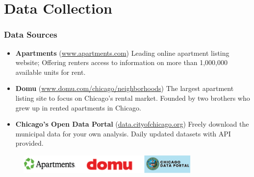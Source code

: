 \documentclass{beamer}
\begin{document}
\section{Data Collection}

\begin{frame}
	\frametitle{Data Sources}
	\begin{itemize}
		\item \textbf{Apartments} (\url{www.apartments.com}) \newline Leading online apartment listing website; Offering renters access to information on more than 1,000,000 available units for rent.
		\item \textbf{Domu} (\url{www.domu.com/chicago/neighborhoods}) \newline The largest apartment listing site to focus on Chicago’s rental market. Founded by two brothers who grew up in rented apartments in Chicago.
		\item \textbf{Chicago's Open Data Portal} (\url{data.cityofchicago.org}) \newline Freely download the municipal data for your own analysis. Daily updated datasets with API provided.
	\end{itemize}
	\begin{figure}[H]
		\centering
		\includegraphics[height=1cm, width=9cm]{figs/data_source.png}
	\end{figure}
\end{frame}
\end{document}

